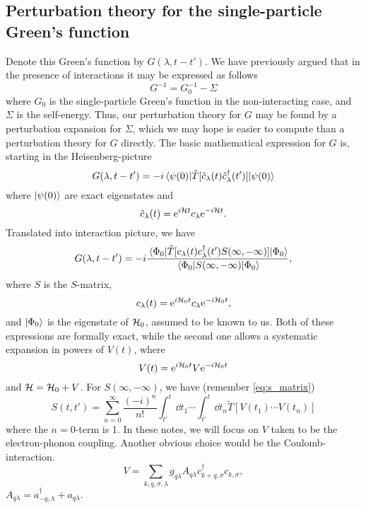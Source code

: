 \subsection[Single particle Green's function]{Perturbation theory for the single-particle Green's function}
Denote this Green's function by $G(\lambda, t-t')$. We have previously argued that in the presence of interactions it may be expressed as follows
\begin{equation} 
G^{-1} = G_0^{-1} - \Sigma
\end{equation}
where $G_0$ is the single-particle Green's function in the non-interacting case, and $\Sigma$ is the self-energy. Thus, our perturbation theory for $G$ may be found by a perturbation expansion for $\Sigma$, which we may hope is easier to compute than a perturbation theory for $G$ directly. The basic mathematical expression for $G$ is, starting in the Heisenberg-picture
\begin{equation} 
G(\lambda, t-t') = -i\ev{\tilde{T}[\hat{c}_\lambda(t)\hat{c}_\lambda^\dagger(t')]}{\psi(0)}
\end{equation}
where $\ket{\psi(0)}$ are exact eigenstates and 
\begin{equation} 
\hat{c}_\lambda(t) = \mathrm{e}^{i\mathcal{H} t}c_\lambda\mathrm{e}^{-i\mathcal{H} t}.
\end{equation}
Translated into interaction picture, we have
\begin{equation} 
G(\lambda, t-t') = -i\frac{\ev{\tilde{T}[{c}_{\lambda}(t){c}_{\lambda}^\dagger(t')S(\infty, -\infty)]}{\Phi_0}}{\ev{S(\infty, -\infty)}{\Phi_0}},
\end{equation}
where $S$ is the $S$-matrix,
\begin{equation} 
c_\lambda(t) = \mathrm{e}^{i\mathcal{H}_0 t}c_\lambda\mathrm{e}^{-i\mathcal{H}_0 t},
\end{equation}
and $\ket{\Phi_0}$  is the eigenstate of $\mathcal{H}_0$, assumed to be known to us. 
Both of these expressions are formally exact, while the second one allows a systematic expansion in powers of $V(t)$, where
\begin{equation} 
V(t) = \mathrm{e}^{i\mathcal{H}_0 t}V\mathrm{e}^{-i\mathcal{H}_0 t}
\end{equation}
and $\mathcal{H} = \mathcal{H}_0 + V$.
For $S(\infty, -\infty)$, we have (remember \cref{eq:s_matrix})
\begin{equation} 
S(t, t') =  \sum_{n=0}^{\infty}\frac{(-i)^n}{n!}\int_{t'}^{t}\dd{t_1}\cdots\int_{t'}^{t}\dd{t_n}\tilde{T}[V(t_1)\cdots V(t_n)]
\end{equation}
where the $n=0$-term is 1. 
In these notes, we will focus on $V$ taken to be the electron-phonon coupling. Another obvious choice would be the Coulomb-interaction. 
\begin{equation}
\label{eq:el_ph}
V =\sum_{k,q, \sigma, \lambda}g_{q\lambda}A_{q\lambda} c_{k+q,\sigma}^\dagger c_{k,\sigma},
\end{equation}
$A_{q\lambda} = a_{-q,\lambda}^\dagger + a_{q\lambda}$.

